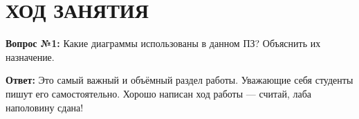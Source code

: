 \section*{ХОД ЗАНЯТИЯ}

\textbf{Вопрос №1:}
Какие диаграммы использованы в данном ПЗ? Объяснить их назначение.

\textbf{Ответ:} 
Это самый важный и объёмный раздел работы. Уважающие себя студенты пишут его самостоятельно.
Хорошо написан ход работы --- считай, лаба наполовину сдана!~\cite{booch}